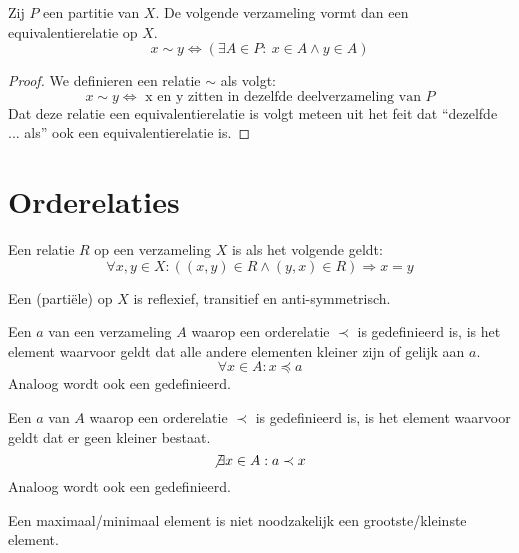 \documentclass[main.tex]{subfiles}
\begin{document}
\begin{st}
  \label{st:partitie-equivalentierelatie}
  Zij $P$ een partitie van $X$.
  De volgende verzameling vormt dan een equivalentierelatie op $X$.
  \[ x \sim y \Leftrightarrow (\exists A \in P:\ x \in A \wedge y \in A )\]

  \begin{proof}
    We definieren een relatie $\sim$ als volgt:
    \[
    x \sim y \Leftrightarrow \text{ x en y zitten in dezelfde deelverzameling van } P
    \]
    Dat deze relatie een equivalentierelatie is volgt meteen uit het feit dat ``dezelfde ... als'' ook een equivalentierelatie is.
  \end{proof}
\end{st}

\section{Orderelaties}
\label{sec:orderelaties}

\begin{de}
  Een relatie $R$ op een verzameling $X$ is  als het volgende geldt:
  \[ \forall x,y \in X: ((x,y) \in R \wedge (y,x) \in R) \Rightarrow x = y \]
\end{de}

\begin{de}
  Een (parti\"ele)  op $X$ is reflexief, transitief en anti-symmetrisch.
\end{de}

\begin{de}
  Een  $a$ van een verzameling $A$ waarop een orderelatie $\prec$ is gedefinieerd is, is het element waarvoor geldt dat alle andere elementen kleiner zijn of gelijk aan $a$.
  \[ \forall x \in A: x \preceq a \] 
  Analoog wordt ook een  gedefinieerd.
\end{de}

\begin{de}
  Een  $a$ van $A$ waarop een orderelatie $\prec$ is gedefinieerd is, is het element waarvoor geldt dat er geen kleiner bestaat.
  \[ \not\exists x \in A: a \prec x \]
  Analoog wordt ook een  gedefinieerd.
\end{de}

\begin{opm}
  Een maximaal/minimaal element is niet noodzakelijk een grootste/kleinste element.    
\end{opm}
\end{document}

